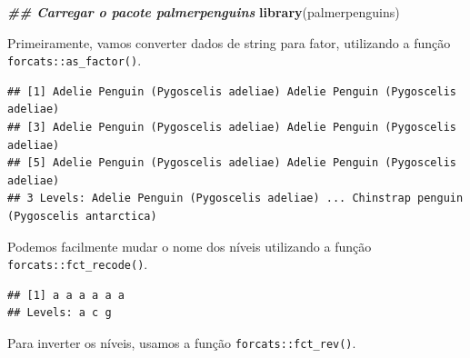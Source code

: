 \documentclass[
]{article}
\newenvironment{Shaded}{\begin{snugshade}}{\end{snugshade}}
\newcommand{\AttributeTok}[1]{\textcolor[rgb]{0.13,0.29,0.53}{#1}}
\newcommand{\DocumentationTok}[1]{\textcolor[rgb]{0.56,0.35,0.01}{\textbf{\textit{#1}}}}
\newcommand{\FunctionTok}[1]{\textcolor[rgb]{0.13,0.29,0.53}{\textbf{#1}}}
\newcommand{\NormalTok}[1]{#1}
\newcommand{\SpecialCharTok}[1]{\textcolor[rgb]{0.81,0.36,0.00}{\textbf{#1}}}
\newcommand{\StringTok}[1]{\textcolor[rgb]{0.31,0.60,0.02}{#1}}
\begin{document}
\begin{Shaded}
\begin{Highlighting}[]
\DocumentationTok{\#\# Carregar o pacote palmerpenguins}
\FunctionTok{library}\NormalTok{(palmerpenguins)}
\end{Highlighting}
\end{Shaded}

Primeiramente, vamos converter dados de string para fator, utilizando a função \texttt{forcats::as\_factor()}.

\begin{Shaded}
\end{Shaded}

\begin{verbatim}
## [1] Adelie Penguin (Pygoscelis adeliae) Adelie Penguin (Pygoscelis adeliae)
## [3] Adelie Penguin (Pygoscelis adeliae) Adelie Penguin (Pygoscelis adeliae)
## [5] Adelie Penguin (Pygoscelis adeliae) Adelie Penguin (Pygoscelis adeliae)
## 3 Levels: Adelie Penguin (Pygoscelis adeliae) ... Chinstrap penguin (Pygoscelis antarctica)
\end{verbatim}

Podemos facilmente mudar o nome dos níveis utilizando a função \texttt{forcats::fct\_recode()}.

\begin{Shaded}
\end{Shaded}

\begin{verbatim}
## [1] a a a a a a
## Levels: a c g
\end{verbatim}

Para inverter os níveis, usamos a função \texttt{forcats::fct\_rev()}.
\end{document}

